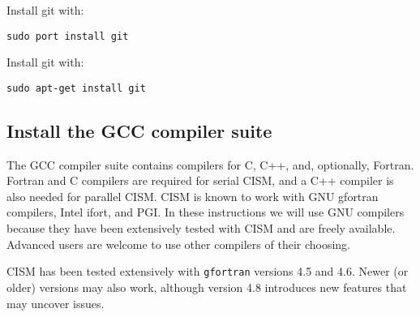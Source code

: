 \begin{mdframed}[style=mac] %
Install git with:

\texttt{sudo port install git}
\end{mdframed}              %


\begin{mdframed}[style=ubuntu] %
Install git with:

\texttt{sudo apt-get install git}
\end{mdframed}                 %


\subsection{Install the GCC compiler suite}

The GCC compiler suite contains compilers for C, C++, and, optionally, Fortran.
Fortran and C compilers are required for serial CISM, and a C++ compiler is also
needed for parallel CISM.  CISM is known to work with GNU gfortran compilers, 
Intel ifort, and PGI.  In these instructions we will use GNU compilers because they
have been extensively tested with CISM and are freely available.  Advanced users
are welcome to use other compilers of their choosing.

CISM has been tested extensively with \texttt{gfortran} versions 4.5 and 4.6.
Newer (or older) versions may also work, although version 4.8 introduces 
new features that may uncover issues.

